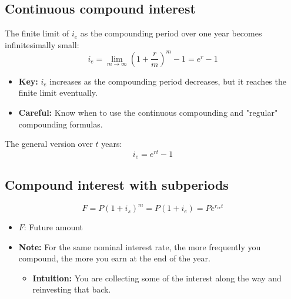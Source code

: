 
\subsection{Continuous compound interest}
\begin{definition}
    The finite limit of \(i_e\) as the compounding period over one year becomes infinitesimally small:
    \begin{equation}
        i_e = \lim_{m \to \infty} \left(1 + \frac{r}{m}\right)^m - 1 = e^r - 1
    \end{equation}
    \begin{itemize}
        \item \textbf{Key:} \(i_e\) increases as the compounding period decreases, but it reaches the finite limit eventually.
        \item \textbf{Careful:} Know when to use the continuous compounding and "regular" compounding formulas. 
    \end{itemize}
    \vspace{1em}
    
    The general version over $t$ years:
    \begin{equation}
        i_e = e^{rt} - 1
    \end{equation}
\end{definition}

\subsection{Compound interest with subperiods}
\begin{definition}
    \begin{equation}
        F = P(1 + i_s)^{m} = P(1 + i_e) = Pe^{r_{cc}t}
    \end{equation}
    \begin{itemize}
        \item \(F\): Future amount 
        \item \textbf{Note:} For the same nominal interest rate, the more frequently you compound, the more you earn at the end of the year.
        \begin{itemize}
            \item \textbf{Intuition:} You are collecting some of the interest along the way and reinvesting that back.
        \end{itemize}
    \end{itemize}
\end{definition}

